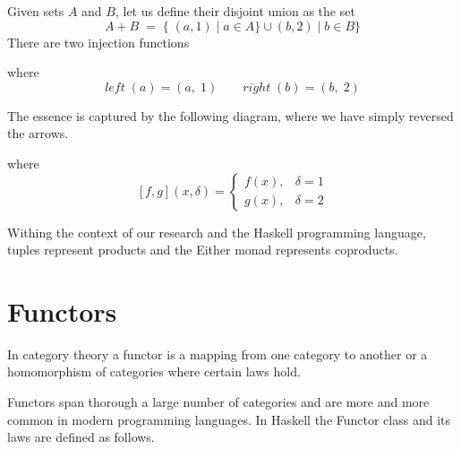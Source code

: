 Given sets $A$ and $B$, let us define their disjoint union as the set $$A + B\; =\; \{\; (a, 1)\; |\; a \in A\} \cup (b, 2)\; |\; b \in B\} $$ There are two injection functions
\begin{center}
\end{center}
where $$ left\; (a) = (a,\; 1) \qquad right\; (b) = (b,\; 2) $$ 

The essence is captured by the following diagram, where we have simply reversed the arrows.

\begin{center}
\end{center}

where $$ [f, g](x,\delta) = \begin{cases} f(x), & \delta = 1 \\ g(x), & \delta = 2 \end{cases} $$

Withing the context of our research and the Haskell programming language, tuples represent products and the Either monad represents coproducts.

\section{Functors}

In category theory a functor is a mapping from one category to another or a homomorphism of categories where certain laws hold. 

Functors span thorough a large number of categories and are more and more common in modern programming languages. In Haskell the Functor class and its laws are defined as follows.

